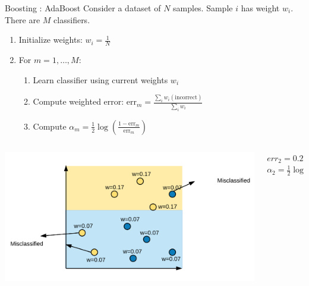 \documentclass[aspectratio=169,10pt]{beamer}
\newcommand{\fitpic}[1]{\begin{adjustbox}{max width=\linewidth, max totalheight=0.78\textheight}#1\end{adjustbox}}
\begin{document}
\begin{frame}{Boosting : AdaBoost }
  Consider a dataset of $N$ samples. Sample $i$ has weight $w_i$. There are $M$ classifiers.\\[0.3cm]
  \begin{enumerate}
    \item Initialize weights: $w_i = \frac{1}{N}$
    \item For $m = 1, \ldots, M$:
          \begin{enumerate}
            \item Learn classifier using current weights $w_i$
            \item Compute weighted error: $\text{err}_m = \frac{\sum_i w_i(\text{incorrect})}{\sum_i w_i}$
            \item Compute $\alpha_m = \tfrac{1}{2}\log\!\left(\frac{1 - \text{err}_m}{\text{err}_m}\right)$
          \end{enumerate}
  \end{enumerate}
  \begin{columns}
    \begin{column}{0.5\textwidth}\centering
      \fitpic{\includegraphics[width=\textwidth]{../assets/ensemble/diagrams/ada_iter2_misclassify}}
    \end{column}
    \begin{column}{0.5\textwidth}
      $err_2 = 0.21$\\
      $\alpha_2 = \tfrac{1}{2}\log\!\left(\frac{0.79}{0.21}\right) \approx 0.66$
    \end{column}
  \end{columns}
\end{frame}
\end{document}
